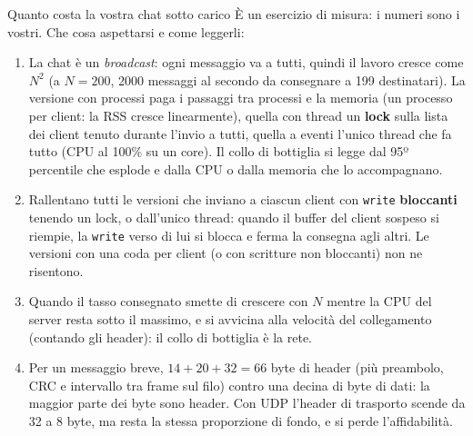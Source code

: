 \begin{esercizio}{Quanto costa la vostra chat sotto carico}
\svolgimento
È un esercizio di misura: i numeri sono i vostri. Che cosa aspettarsi e come leggerli:
\begin{enumerate}[label=(\alph*)]
    \item La chat è un \emph{broadcast}: ogni messaggio va a tutti, quindi il lavoro cresce come $N^2$ (a $N = 200$, 2000 messaggi al secondo
          da consegnare a 199 destinatari). La versione con processi paga i passaggi tra processi e la memoria (un processo per client: la RSS
          cresce linearmente), quella con thread un \textbf{lock} sulla lista dei client tenuto durante l'invio a tutti, quella a eventi
          l'unico thread che fa tutto (CPU al 100\% su un core). Il collo di bottiglia si legge dal 95º percentile che esplode e dalla CPU o
          dalla memoria che lo accompagnano.
    \item Rallentano tutti le versioni che inviano a ciascun client con \texttt{write} \textbf{bloccanti} tenendo un lock, o dall'unico
          thread: quando il buffer del client sospeso si riempie, la \texttt{write} verso di lui si blocca e ferma la consegna agli altri. Le
          versioni con una coda per client (o con scritture non bloccanti) non ne risentono.
    \item Quando il tasso consegnato smette di crescere con $N$ mentre la CPU del server resta sotto il massimo, e si avvicina alla velocità
          del collegamento (contando gli header): il collo di bottiglia è la rete.
    \item Per un messaggio breve, $14 + 20 + 32 = 66$ byte di header (più preambolo, CRC e intervallo tra frame sul filo) contro una decina di
          byte di dati: la maggior parte dei byte sono header. Con UDP l'header di trasporto scende da 32 a 8 byte, ma resta la stessa
          proporzione di fondo, e si perde l'affidabilità.
\end{enumerate}
\end{esercizio}
